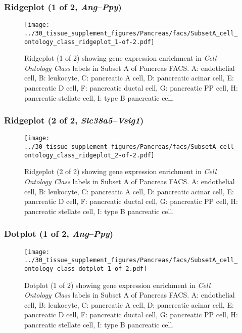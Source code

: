\clearpage

\subsubsection{Ridgeplot (1 of 2, \emph{Ang}--\emph{Ppy})}
\begin{figure}[h]
\centering
\texttt{[image: ../30\_tissue\_supplement\_figures/Pancreas/facs/SubsetA\_cell\_ontology\_class\_ridgeplot\_1-of-2.pdf]}

\caption{ Ridgeplot (1 of 2)  showing gene expression enrichment in \emph{Cell Ontology Class} labels in Subset A of Pancreas FACS. A: endothelial cell, B: leukocyte, C: pancreatic A cell, D: pancreatic acinar cell, E: pancreatic D cell, F: pancreatic ductal cell, G: pancreatic PP cell, H: pancreatic stellate cell, I: type B pancreatic cell.}
\end{figure}


\clearpage

\subsubsection{Ridgeplot (2 of 2, \emph{Slc38a5}--\emph{Vsig1})}
\begin{figure}[h]
\centering
\texttt{[image: ../30\_tissue\_supplement\_figures/Pancreas/facs/SubsetA\_cell\_ontology\_class\_ridgeplot\_2-of-2.pdf]}

\caption{ Ridgeplot (2 of 2)  showing gene expression enrichment in \emph{Cell Ontology Class} labels in Subset A of Pancreas FACS. A: endothelial cell, B: leukocyte, C: pancreatic A cell, D: pancreatic acinar cell, E: pancreatic D cell, F: pancreatic ductal cell, G: pancreatic PP cell, H: pancreatic stellate cell, I: type B pancreatic cell.}
\end{figure}


\clearpage

\subsubsection{Dotplot (1 of 2, \emph{Ang}--\emph{Ppy})}
\begin{figure}[h]
\centering
\texttt{[image: ../30\_tissue\_supplement\_figures/Pancreas/facs/SubsetA\_cell\_ontology\_class\_dotplot\_1-of-2.pdf]}

\caption{ Dotplot (1 of 2)  showing gene expression enrichment in \emph{Cell Ontology Class} labels in Subset A of Pancreas FACS. A: endothelial cell, B: leukocyte, C: pancreatic A cell, D: pancreatic acinar cell, E: pancreatic D cell, F: pancreatic ductal cell, G: pancreatic PP cell, H: pancreatic stellate cell, I: type B pancreatic cell.}
\end{figure}


